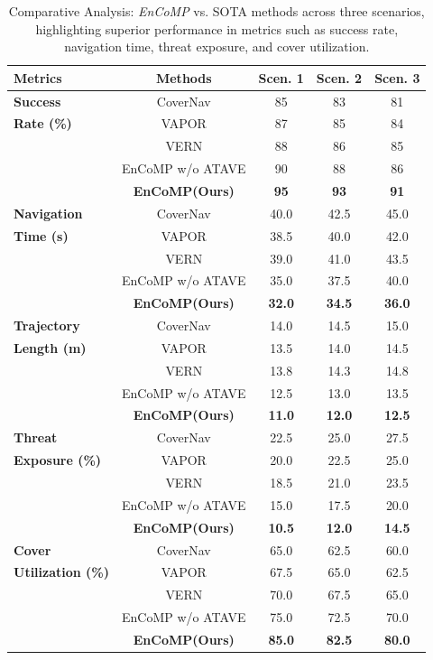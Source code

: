 \begin{table}[ht]
\centering
\scriptsize
\begin{tabular}{|l|c|c|c|c|}
\hline
\textbf{Metrics} & \textbf{Methods} & \textbf{Scen. 1} & \textbf{Scen. 2} & \textbf{Scen. 3} \\
\hline
\textbf{Success} & CoverNav & 85 & 83 & 81 \\
\textbf{Rate (\%)} & VAPOR & 87 & 85 & 84 \\
& VERN & 88 & 86 & 85 \\
& EnCoMP w/o ATAVE & 90 & 88 & 86 \\
& \textbf{EnCoMP(Ours)} & \textbf{95} & \textbf{93} & \textbf{91} \\
\hline
\textbf{Navigation} & CoverNav & 40.0 & 42.5 & 45.0 \\
\textbf{Time (s)} & VAPOR & 38.5 & 40.0 & 42.0 \\
& VERN & 39.0 & 41.0 & 43.5 \\
& EnCoMP w/o ATAVE & 35.0 & 37.5 & 40.0 \\
& \textbf{EnCoMP(Ours)} & \textbf{32.0} & \textbf{34.5} & \textbf{36.0} \\
\hline
\textbf{Trajectory} & CoverNav & 14.0 & 14.5 & 15.0 \\
\textbf{Length (m)} & VAPOR & 13.5 & 14.0 & 14.5 \\
& VERN & 13.8 & 14.3 & 14.8 \\
& EnCoMP w/o ATAVE & 12.5 & 13.0 & 13.5 \\
& \textbf{EnCoMP(Ours)} & \textbf{11.0} & \textbf{12.0} & \textbf{12.5} \\
\hline
\textbf{Threat} & CoverNav & 22.5 & 25.0 & 27.5 \\
\textbf{Exposure (\%)} & VAPOR & 20.0 & 22.5 & 25.0 \\
& VERN & 18.5 & 21.0 & 23.5 \\
& EnCoMP w/o ATAVE & 15.0 & 17.5 & 20.0 \\
& \textbf{EnCoMP(Ours)} & \textbf{10.5} & \textbf{12.0} & \textbf{14.5} \\
\hline
\textbf{Cover} & CoverNav & 65.0 & 62.5 & 60.0 \\
\textbf{Utilization (\%)} & VAPOR & 67.5 & 65.0 & 62.5 \\
& VERN & 70.0 & 67.5 & 65.0 \\
& EnCoMP w/o ATAVE & 75.0 & 72.5 & 70.0 \\
& \textbf{EnCoMP(Ours)} & \textbf{85.0} & \textbf{82.5} & \textbf{80.0} \\
\hline
\end{tabular}
\caption{Comparative Analysis: \textit{EnCoMP} vs. SOTA methods across three scenarios, highlighting superior performance in metrics such as success rate, navigation time, threat exposure, and cover utilization.}
\label{tab:real_results}
\end{table}

